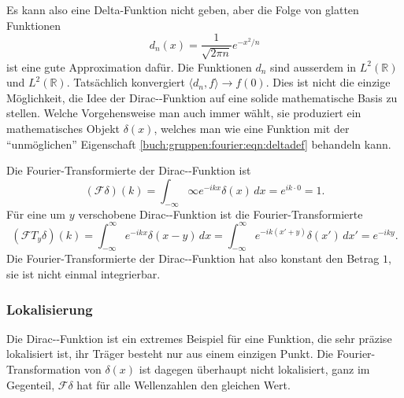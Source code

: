 Es kann also eine Delta-Funktion nicht geben, aber die Folge von
glatten Funktionen
\[
d_n(x) = \frac{1}{\sqrt{2\pi n}} e^{-x^2/n}
\]
ist eine gute Approximation dafür.
Die Funktionen $d_n$ sind ausserdem in $L^2(\mathbb{R})$ und
$L^2(\mathbb{R})$.
Tatsächlich konvergiert $\langle d_n,f\rangle \to f(0)$.
Dies ist nicht die einzige Möglichkeit, die Idee der 
Dirac-\textdelta-Funktion auf eine solide mathematische Basis zu
stellen.
Welche Vorgehensweise man auch immer wählt, sie produziert ein
mathematisches Objekt $\delta(x)$, welches man wie eine Funktion
mit der ``unmöglichen'' Eigenschaft
\eqref{buch:gruppen:fourier:eqn:deltadef}
behandeln kann.

Die Fourier-Transformierte der Dirac-\textdelta-Funktion ist
\[
(\mathscr{F}\delta)(k)
=
\int_{-\infty}\infty e^{-ikx}\delta(x)\,dx
=
e^{ik\cdot 0}
=
1.
\]
Für eine um $y$ verschobene Dirac-\textdelta-Funktion ist die
Fourier-Transformierte
\[
(\mathscr{F}T_y\delta)(k)
=
\int_{-\infty}^\infty e^{-ikx}\delta(x-y)\,dx
=
\int_{-\infty}^\infty e^{-ik(x'+y)}\delta(x')\,dx'
=
e^{-iky}.
\]
Die Fourier-Transformierte der Dirac-\textdelta-Funktion hat also 
konstant den Betrag $1$, sie ist nicht einmal integrierbar.

%
%
\subsubsection{Lokalisierung}
Die Dirac-\textdelta-Funktion ist ein extremes Beispiel für eine
Funktion, die sehr präzise lokalisiert ist, ihr Träger besteht nur
aus einem einzigen Punkt.
Die Fourier-Transformation von $\delta(x)$ ist dagegen überhaupt
nicht lokalisiert, ganz im Gegenteil, $\mathscr{F}\delta$ hat für alle
Wellenzahlen den gleichen Wert.

